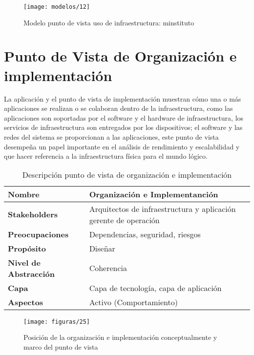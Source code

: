  \begin{figure}[H]
  	\centering
  	\texttt{[image: modelos/12]}
  	\captionsetup{width=.95\textwidth}
  	\caption{Modelo punto de vista uso de infraestructura: minstituto}
  	\label{modelo12}
  \end{figure}
  
  \section{Punto de Vista de Organización e implementación}
  La aplicación y el punto de vista de implementación muestran cómo una o más aplicaciones se realizan o se colaboran dentro de la infraestructura, como las aplicaciones son soportadas por el software y el hardware de infraestructura, los servicios de infraestructura son entregados por los dispositivos; el software y las redes del sistema se proporcionan a las aplicaciones, este punto de vista desempeña un papel importante en el análisis de rendimiento y escalabilidad y que hacer referencia a la infraestructura física para el mundo
  lógico.
  
  \begin{table}[H]
  	\centering
  	\begin{tabular}{lp{8cm}}
  		\toprule
  		\textbf{Nombre} & \textbf{Organización e Implementanción} \\
  		\midrule
  		\textbf{Stakeholders} & Arquitectos de infraestructura y aplicación gerente de operación \\
  		\textbf{Preocupaciones} & Dependencias, seguridad, riesgos \\
  		\textbf{Propósito} & Diseñar \\
  		\textbf{Nivel de Abstracción} & Coherencia \\
  		\textbf{Capa} & Capa de tecnología, capa de aplicación \\
  		\textbf{Aspectos} & Activo (Comportamiento) \\
  		\bottomrule
  	\end{tabular}
  	\captionsetup{width=.95\textwidth}
  	\caption{Descripción punto de vista de organización e implementación}
  	\label{tabla16}
  \end{table}
  
  \begin{figure}[H]
  	\centering
  	\texttt{[image: figuras/25]}
  	\captionsetup{width=.95\textwidth}
  	\caption{Posición de la organización e implementación conceptualmente y marco del punto de vista}
  	\label{figura25}
  \end{figure}
  
